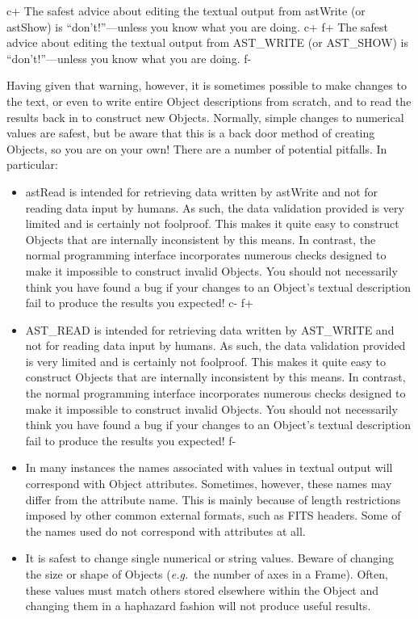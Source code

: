 \documentclass[twoside,11pt]{starlink}
\begin{document}
{c+
The safest advice about editing the textual output from astWrite (or
astShow) is ``don't!''---unless you know what you are doing.
c+
f+
The safest advice about editing the textual output from AST\_WRITE (or
AST\_SHOW) is ``don't!''---unless you know what you are doing.
f-

Having given that warning, however, it is sometimes possible to make
changes to the text, or even to write entire Object descriptions from
scratch, and to read the results back in to construct new
Objects. Normally, simple changes to numerical values are safest, but
be aware that this is a back door method of creating Objects, so
you are on your own! There are a number of potential pitfalls. In
particular:

\begin{itemize}
c+
\item astRead is intended for retrieving data written by astWrite and
not for reading data input by humans. As such, the data validation
provided is very limited and is certainly not foolproof. This makes it
quite easy to construct Objects that are internally inconsistent by
this means. In contrast, the normal programming interface incorporates
numerous checks designed to make it impossible to construct invalid
Objects. You should not necessarily think you have found a bug if your
changes to an Object's textual description fail to produce the results
you expected!
c-
f+
\item AST\_READ is intended for retrieving data written by AST\_WRITE
and not for reading data input by humans. As such, the data validation
provided is very limited and is certainly not foolproof. This makes it
quite easy to construct Objects that are internally inconsistent by
this means. In contrast, the normal programming interface incorporates
numerous checks designed to make it impossible to construct invalid
Objects. You should not necessarily think you have found a bug if your
changes to an Object's textual description fail to produce the results
you expected!
f-

\item In many instances the names associated with values in textual
output will correspond with Object attributes. Sometimes, however,
these names may differ from the attribute name. This is mainly because
of length restrictions imposed by other common external formats, such
as FITS headers. Some of the names used do not correspond with
attributes at all.

\item It is safest to change single numerical or string values.
Beware of changing the size or shape of Objects (\emph{e.g.}\ the
number of axes in a Frame). Often, these values must match others
stored elsewhere within the Object and changing them in a haphazard
fashion will not produce useful results.


\end{itemize}}
\end{document}
